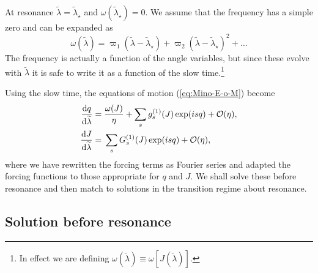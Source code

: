 At resonance $\widetilde{\lambda} = \widetilde{\lambda}_\star$ and $\omega\left(\widetilde{\lambda}_\star\right) = 0$. We assume that the frequency has a simple zero and can be expanded as
\begin{equation}
\omega\left(\widetilde{\lambda}\right) = \varpi_1\left(\widetilde{\lambda} - \widetilde{\lambda}_\star\right) + \varpi_2\left(\widetilde{\lambda} - \widetilde{\lambda}_\star\right)^2 + \ldots
\label{eq:omega-series}
\end{equation}
The frequency is actually a function of the angle variables, but since these evolve with $\widetilde{\lambda}$ it is safe to write it as a function of the slow time.\footnote{In effect we are defining $\omega\left(\tilde{\lambda}\right) \equiv \omega\left[J\left(\tilde{\lambda}\right)\right]$.}

Using the slow time, the equations of motion (\ref{eq:Mino-E-o-M}) become
\begin{subequations}
\begin{align}
\dfrac{\mathrm{d} {q}}{\mathrm{d} {\widetilde{\lambda}}} = {} & \dfrac{\omega(J)}{\eta} + \sum_s g_s^{(1)}(J)\exp(is q)  + \mathcal{O}({\eta}), \\
\dfrac{\mathrm{d} {J}}{\mathrm{d} {\widetilde{\lambda}}} = {} & \sum_s G_s^{(1)}(J)\exp(is q) + \mathcal{O}({\eta}),
\end{align}
\end{subequations}
where we have rewritten the forcing terms as Fourier series and adapted the forcing functions to those appropriate for $q$ and $J$. We shall solve these before resonance and then match to solutions in the transition regime about resonance.

\subsection{Solution before resonance}\label{sec:before-res}

